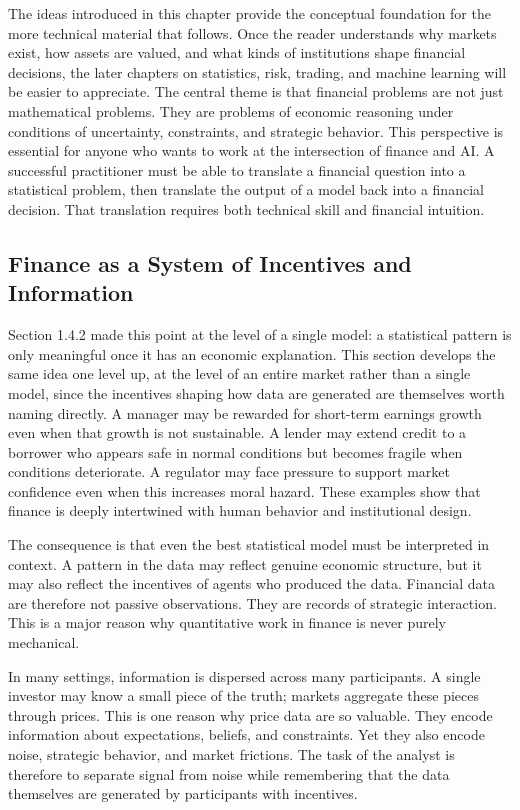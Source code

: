 \documentclass[../ai_in_finance]{subfiles}
\begin{document}
The ideas introduced in this chapter provide the conceptual foundation for the more technical material that follows. Once the reader understands why markets exist, how assets are valued, and what kinds of institutions shape financial decisions, the later chapters on statistics, risk, trading, and machine learning will be easier to appreciate. The central theme is that financial problems are not just mathematical problems. They are problems of economic reasoning under conditions of uncertainty, constraints, and strategic behavior.
This perspective is essential for anyone who wants to work at the intersection of finance and AI. A successful practitioner must be able to translate a financial question into a statistical problem, then translate the output of a model back into a financial decision. That translation requires both technical skill and financial intuition.

\subsection{Finance as a System of Incentives and Information}

Section 1.4.2 made this point at the level of a single model: a statistical pattern is only meaningful once it has an economic explanation. This section develops the same idea one level up, at the level of an entire market rather than a single model, since the incentives shaping how data are generated are themselves worth naming directly. A manager may be rewarded for short-term earnings growth even when that growth is not sustainable. A lender may extend credit to a borrower who appears safe in normal conditions but becomes fragile when conditions deteriorate. A regulator may face pressure to support market confidence even when this increases moral hazard. These examples show that finance is deeply intertwined with human behavior and institutional design.

The consequence is that even the best statistical model must be interpreted in context. A pattern in the data may reflect genuine economic structure, but it may also reflect the incentives of agents who produced the data. Financial data are therefore not passive observations. They are records of strategic interaction. This is a major reason why quantitative work in finance is never purely mechanical.

In many settings, information is dispersed across many participants. A single investor may know a small piece of the truth; markets aggregate these pieces through prices. This is one reason why price data are so valuable. They encode information about expectations, beliefs, and constraints. Yet they also encode noise, strategic behavior, and market frictions. The task of the analyst is therefore to separate signal from noise while remembering that the data themselves are generated by participants with incentives.
\end{document}
